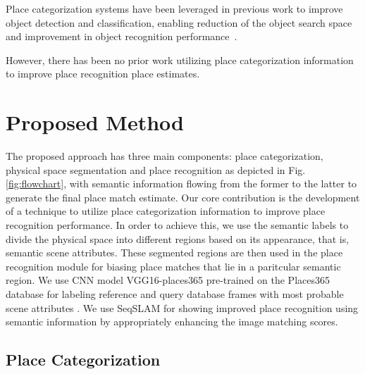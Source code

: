 \documentclass[letterpaper, 10 pt, conference]{ieeeconf}  %
\begin{document}
Place categorization systems have been leveraged in previous work to improve object detection and classification, enabling reduction of the object search space and improvement in object recognition performance~\cite{torralba2003context}. 

However, there has been no prior work utilizing place categorization information to improve place recognition place estimates. 




\section{Proposed Method}
The proposed approach has three main components: place categorization, physical space segmentation and place recognition as depicted in Fig. \ref{fig:flowchart}, with semantic information flowing from the former to the latter to generate the final place match estimate. Our core contribution is the development of a technique to utilize place categorization information to improve place recognition performance. In order to achieve this, we use the semantic labels to divide the physical space into different regions based on its appearance, that is, semantic scene attributes. These segmented regions are then used in the place recognition module for biasing place matches that lie in a paritcular semantic region. We use CNN model VGG16-places365 \cite{cnnPlaces365Github} pre-trained on the Places365 database \cite{zhou2014learning} for labeling reference and query database frames with most probable scene attributes \cite{Patterson2012SunAttributes}. We use SeqSLAM \cite{Milford2012} for showing improved place recognition using semantic information by appropriately enhancing the image matching scores.

\subsection{Place Categorization}
\end{document}
